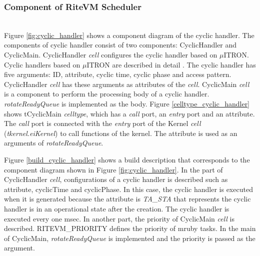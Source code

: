 \documentclass[conference,compsoc]{IEEEtran}
\begin{document}
\subsubsection{Component of RiteVM Scheduler} \mbox{}\\

Figure \ref{fig:cyclic_handler} shows a component diagram of the cyclic handler.
The components of cyclic handler consist of two components: CyclicHandler and CyclicMain.
CyclicHandler {\it cell} configures the cyclic handler based on $\mu$ITRON.
Cyclic handlers based on $\mu$ITRON are described in detail \cite{par:microITRON}.
The cyclic handler has five arguments: ID, attribute, cyclic time, cyclic phase and access pattern.
CyclicHandler {\it cell} has these arguments as attributes of the {\it cell}.
CyclicMain {\it cell} is a component to perform the processing body of a cyclic handler.
{\it rotateReadyQueue} is implemented as the body.
Figure \ref{celltype_cyclic_handler} shows tCyclicMain {\it celltype}, which has a {\it call} port, an {\it entry} port and an attribute.
The {\it call} port is connected with the {\it entry} port of the Kernel {\it cell} ({\it tkernel.eiKernel}) to call functions of the kernel. 
The attribute is used as an arguments of {\it rotateReadyQueue}.

Figure \ref{build_cyclic_handler} shows a build description that corresponds to the component diagram shown in Figure \ref{fig:cyclic_handler}.
In the part of CyclicHandler {\it cell}, configurations of a cyclic handler is described such as attribute, cyclicTime and cyclicPhase.
In this case, the cyclic handler is executed when it is generated because the attribute is {\it TA\_STA} that represents the cyclic handler is in an operational state after the creation.
The cyclic handler is executed every one msec.
In another part, the priority of CyclicMain {\it cell} is described.
RITEVM\_PRIORITY defines the priority of mruby tasks.
In the main of CyclicMain, {\it rotateReadyQueue} is implemented and the priority is passed as the argument.
\end{document}
